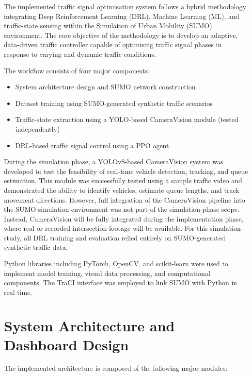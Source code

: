 \documentclass[11pt, a4paper]{report}
\begin{document}
The implemented traffic signal optimisation system follows a hybrid methodology integrating Deep Reinforcement Learning (DRL), Machine Learning (ML), and traffic-state sensing within the Simulation of Urban Mobility (SUMO) environment. The core objective of the methodology is to develop an adaptive, data-driven traffic controller capable of optimising traffic signal phases in response to varying and dynamic traffic conditions.

The workflow consists of four major components:

\begin{itemize}
    \item System architecture design and SUMO network construction
    \item Dataset training using SUMO-generated synthetic traffic scenarios
    \item Traffic-state extraction using a YOLO-based CameraVision module (tested independently)
    \item DRL-based traffic signal control using a PPO agent
\end{itemize}

During the simulation phase, a YOLOv8-based CameraVision system was developed to test the feasibility of real-time vehicle detection, tracking, and queue estimation. This module was successfully tested using a sample traffic video and demonstrated the ability to identify vehicles, estimate queue lengths, and track movement directions. However, full integration of the CameraVision pipeline into the SUMO simulation environment was not part of the simulation-phase scope. Instead, CameraVision will be fully integrated during the implementation phase, where real or recorded intersection footage will be available. For this simulation study, all DRL training and evaluation relied entirely on SUMO-generated synthetic traffic data.

Python libraries including PyTorch, OpenCV, and scikit-learn were used to implement model training, visual data processing, and computational components. The TraCI interface was employed to link SUMO with Python in real time.



\section{System Architecture and Dashboard Design}

The implemented architecture is composed of the following major modules:
\end{document}
